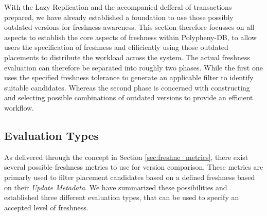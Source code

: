 With the Lazy Replication and the accompanied defferal of transactions prepared, we have already established a foundation to use those possibly outdated versions
for freshness-awareness. This section therefore focusses on all aspects to establish the core aspects of freshness within Polypheny-DB,
to allow users the specification of freshness and efificiently using those outdated placements to distribute the workload across the system.
The actual freshness evaluation can therefore be separated into roughly two phases. While the first one uses the specified freshness tolerance to generate an 
applicable filter to identify suitable candidates. Whereas the second phase is concerned with constructing and selecting possible combinations of outdated versions
to provide an efficient workflow.



\subsection{Evaluation Types}
\label{sec:eval_types}

As delivered through the concept in Section \ref{sec:freshne_metrics}, there exist several possible freshness metrics to use for version comparison.
These metrics are primarly used to filter placement candidates based on a defined freshness based on their \emph{Update Metadata}.
We have summarized these possibilities and established three different evaluation types, that can be used to specify an accepted level of freshness.


